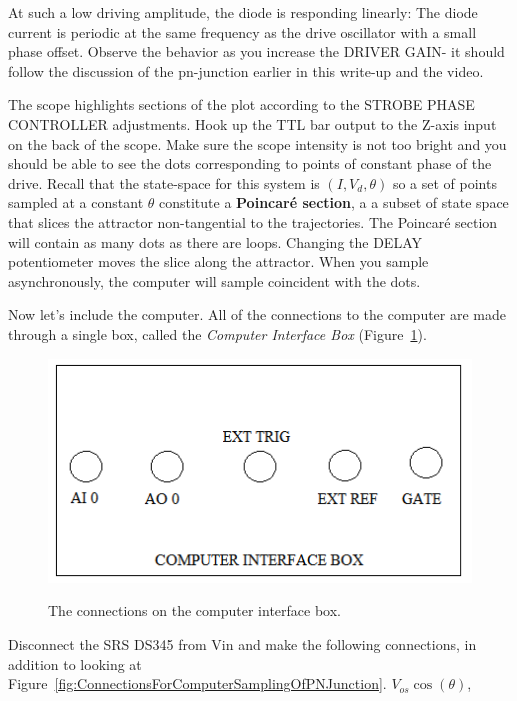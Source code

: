 \documentclass{../lab}
\begin{document}
At such a low driving amplitude, the diode is responding linearly: The diode current is periodic at the same frequency as the drive oscillator with a small phase offset. Observe the behavior as you increase the DRIVER GAIN- it should follow the discussion of the pn-junction earlier in this write-up and the video.

The scope highlights sections of the plot according to the STROBE PHASE CONTROLLER adjustments. Hook up the TTL bar output to the Z-axis input on the back of the scope. Make sure the scope intensity is not too bright and you should be able to see the dots corresponding to points of constant phase of the drive. Recall that the state-space for this system is $(I, V_d,\theta)$ so a set of points sampled at a constant $\theta$ constitute a \textbf{Poincaré section}, a a subset of state space that slices the attractor non-tangential to the trajectories. The Poincaré section will contain as many dots as there are loops. Changing the DELAY potentiometer moves the slice along the attractor. When you sample asynchronously, the computer will sample coincident with the dots.

Now let's include the computer. All of the connections to the computer are made through a single box, called the \emph{Computer Interface Box} (Figure~\ref{fig:ConnectionsOnComputerInterfaceBox}).

\begin{figure}[h]
    \centering
    \href{http://experimentationlab.berkeley.edu/sites/default/files/images/NLD_DAQBOX.png}{\includegraphics[width=0.5\linewidth]{images/NLD_DAQBOX.png}}
    \caption{The connections on the computer interface box.}
    \label{fig:ConnectionsOnComputerInterfaceBox}
\end{figure}

Disconnect the SRS DS345 from Vin and make the following connections, in addition to looking at Figure~\ref{fig:ConnectionsForComputerSamplingOfPNJunction}. $V_{os} \cos(\theta)$,
\end{document}
